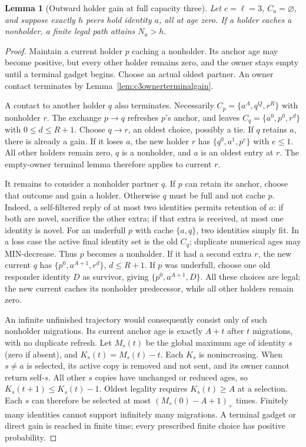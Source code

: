 \documentclass[11pt]{article}
\newtheorem{lemma}[theorem]{Lemma}
\begin{document}
\begin{lemma}[Outward holder gain at full capacity three]
\label{lem:c3outwardgain}
Let $c=\ell=3$, $C_a=\varnothing$, and suppose exactly $h$
peers hold identity $a$, all at age zero. If a holder caches
a nonholder, a finite legal path attains $N_a>h$.
\end{lemma}
\begin{proof}
Maintain a current holder $p$ caching a nonholder. Its anchor
age may become positive, but every other holder remains zero,
and the owner stays empty until a terminal gadget begins.
Choose an actual oldest partner. An owner contact terminates
by Lemma~\ref{lem:c3ownerterminalgain}.

A contact to another holder $q$ also terminates. Necessarily
$C_p=\{a^A,q^Q,r^R\}$ with nonholder $r$. The exchange
$p\to q$ refreshes $p$'s anchor, and leaves
$C_q=\{a^0,p^0,r^d\}$ with $0\le d\le R+1$.
Choose $q\to r$, an oldest choice, possibly a tie. If $q$
retains $a$, there is already a gain. If it loses $a$, the
new holder $r$ has $\{q^0,a^1,p^e\}$ with $e\le1$.
All other holders remain zero, $q$ is a nonholder, and $a$
is an oldest entry at $r$. The empty-owner terminal lemma
therefore applies to current $r$.

It remains to consider a nonholder partner $q$. If $p$ can
retain its anchor, choose that outcome and gain a holder.
Otherwise $q$ must be full and not cache $p$. Indeed, a
self-filtered reply of at most two identities permits retention
of $a$: if both are novel, sacrifice the other extra; if that
extra is received, at most one identity is novel. For an
underfull $p$ with cache $\{a,q\}$, two identities simply fit.
In a loss case the active final identity set is the old
$C_q$; duplicate numerical ages may MIN-decrease. Thus $p$
becomes a nonholder. If it had a second extra $r$, the new
current $q$ has $\{p^0,a^{A+1},r^d\}$, $d\le R+1$.
If $p$ was underfull, choose one old responder identity $D$
as survivor, giving $\{p^0,a^{A+1},D\}$. All these choices
are legal; the new current caches its nonholder predecessor,
while all other holders remain zero.

An infinite unfinished trajectory would consequently consist
only of such nonholder migrations. Its current anchor age is
exactly $A+t$ after $t$ migrations, with no duplicate refresh.
Let $M_s(t)$ be the global maximum age of identity $s$ (zero
if absent), and $K_s(t)=M_s(t)-t$. Each $K_s$ is nonincreasing.
When $s\ne a$ is selected, its active copy is removed and
not sent, and its owner cannot return self-$s$. All other
$s$ copies have unchanged or reduced ages, so
$K_s(t+1)\le K_s(t)-1$. Oldest legality requires
$K_s(t)\ge A$ at a selection. Each $s$ can therefore be
selected at most $(M_s(0)-A+1)_+$ times. Finitely many
identities cannot support infinitely many migrations.
A terminal gadget or direct gain is reached in finite time;
every prescribed finite choice has positive probability.
\end{proof}
\end{document}
